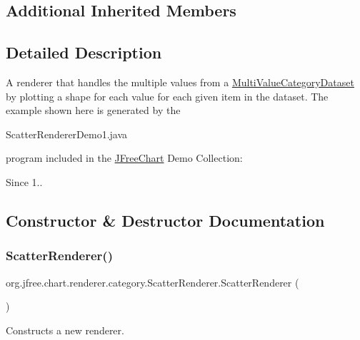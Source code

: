 \subsection*{Additional Inherited Members}


\subsection{Detailed Description}
A renderer that handles the multiple values from a \mbox{\hyperlink{}{Multi\+Value\+Category\+Dataset}} by plotting a shape for each value for each given item in the dataset. The example shown here is generated by the
\begin{DoxyCode}
ScatterRendererDemo1.java 
\end{DoxyCode}
 program included in the \mbox{\hyperlink{classorg_1_1jfree_1_1chart_1_1_j_free_chart}{J\+Free\+Chart}} Demo Collection\+: ~\newline
~\newline
 

\begin{DoxySince}{Since}
1.. 
\end{DoxySince}


\subsection{Constructor \& Destructor Documentation}
\mbox{\label{classorg_1_1jfree_1_1chart_1_1renderer_1_1category_1_1_scatter_renderer_a8ee11b4f57b59dc694e84773461bf434}} 
\subsubsection{\texorpdfstring{Scatter\+Renderer()}{ScatterRenderer()}}
{\footnotesize\ttfamily org.\+jfree.\+chart.\+renderer.\+category.\+Scatter\+Renderer.\+Scatter\+Renderer (\begin{DoxyParamCaption}{ }\end{DoxyParamCaption})}

Constructs a new renderer. 

